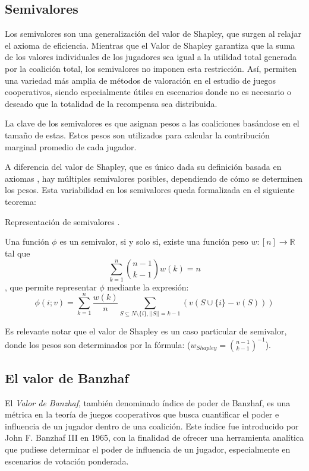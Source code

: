 \subsection{Semivalores}

Los semivalores son una generalización del valor de Shapley,
que surgen al relajar el axioma de eficiencia. Mientras que
el Valor de Shapley garantiza que la suma de los valores
individuales de los jugadores sea igual a la utilidad total
generada por la coalición total, los semivalores no imponen
esta restricción. Así, permiten una variedad más amplia de
métodos de valoración en el estudio de juegos cooperativos,
siendo especialmente útiles en escenarios donde no es necesario
o deseado que la totalidad de la recompensa sea distribuida.

La clave de los semivalores es que asignan pesos a las
coaliciones basándose en el tamaño de estas. Estos pesos
son utilizados para calcular la contribución marginal promedio
de cada jugador.

A diferencia del valor de Shapley, que es único dada su
definición basada en axiomas \cite{shapleyValue}, hay múltiples
semivalores posibles, dependiendo de cómo se determinen
los pesos. Esta variabilidad en los semivalores queda
formalizada en el siguiente teorema:

\begin{theorem}{Representación de semivalores \cite{Dubey2}.}
  
  Una función $\phi$ es un semivalor, si y solo
  si, existe una función peso $w:[n] \rightarrow
  \mathbb{R}$ tal que
  $$\sum_{k=1}^n \binom{n-1}{k-1}w(k) = n$$,
  que permite representar $\phi$ mediante la expresión:
  $$
  \phi(i;v) = \sum_{k=1}^n \frac{w(k)}{n}
  \sum_{S \subseteq N \setminus \{i \},||S||=k-1}
  (v(S\cup \{i\} - v(S)))
  $$
\end{theorem}

Es relevante notar que el valor de Shapley es un caso
particular de semivalor, donde los pesos son determinados
por la fórmula: ($w_{Shapley} = \binom{n-1}{k-1}^{-1}$).


\subsection{El valor de Banzhaf}

El \emph{Valor de Banzhaf}, también denominado índice de poder
de Banzhaf\cite{banzhaf}, es una métrica en la teoría de juegos
cooperativos que busca cuantificar el poder e influencia de un
jugador dentro de una coalición.
Este índice fue introducido por John F. Banzhaf III en 1965,
con la finalidad de ofrecer una herramienta analítica que
pudiese determinar el poder de influencia de un jugador,
especialmente en escenarios de votación ponderada.

